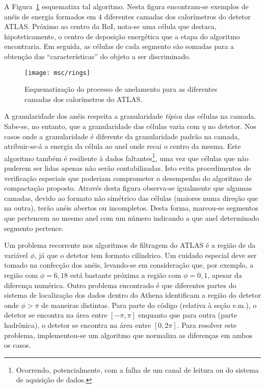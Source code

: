 A Figura~\ref{fig:rings} esquematiza tal algoritmo. Nesta figura encontram-se
exemplos de anéis de energia formados em 4 diferentes camadas dos calorímetros
do detetor ATLAS. Próximo ao centro da RoI, nota-se uma célula que destaca,
hipoteticamente, o centro de deposição energética que a etapa  do
algoritmo encontraria. Em seguida, as células de cada segmento são somadas
para a obtenção das ``características'' do objeto a ser discriminado.

\begin{figure}
\begin{center}
\texttt{[image: msc/rings]}
\end{center}
\caption{Esquematização do processo de anelamento para as diferentes camadas
dos calorímetros do ATLAS.}
\label{fig:rings}
\end{figure}

A granularidade dos anéis respeita a granularidade \emph{típica} das células
na camada. Sabe-se, no entanto, que a granularidade das células varia com
$\eta$ no detetor. Nos casos onde a granularidade é diferente da granularidade
padrão na camada, atribuir-se-á a energia da célula ao anel onde recai o
centro da mesma. Este algoritmo também é resiliente à dados
faltantes\footnote{Ocorrendo, potencialmente, com a falha de um canal de
leitura ou do sistema de aquisição de dados.}, uma vez que células que não
puderem ser lidas apenas não serão contabilizadas. Isto evita procedimentos de
verificação especiais que poderiam comprometer o desempenho do algoritmo de
compactação proposto. Através desta figura observa-se igualmente que algumas
camadas, devido ao formato não simétrico das células (maiores numa direção que
na outra), terão anéis abertos ou incompletos. Desta forma, marcou-se
segmentos que pertencem ao mesmo anel com um número indicando a que anel
determinado segmento pertence.

Um problema recorrente nos algoritmos de filtragem do ATLAS é a região de
 da variável $\phi$, já que o detetor tem formato
cilíndrico. Um cuidado especial deve ser tomado na confecção dos anéis,
levando-se em consideração que, por exemplo, a região com $\phi = 6,18$ está
bastante próxima a região com $\phi = 0,1$, apesar da diferença
numérica. Outro problema encontrado é que diferentes partes do sistema de
localização dos dados dentro do Athena identificam a região do detetor onde
$\phi > \pi$ de maneiras distintas. Para parte do código (relativa à seção
e.m.), o detetor se encontra na área entre $[-\pi, \pi]$ enquanto que para
outra (parte hadrônica), o detetor se encontra na área entre $[0, 2\pi]$. Para
resolver este problema, implementou-se um algoritmo que normaliza as
diferenças em ambos os casos.

